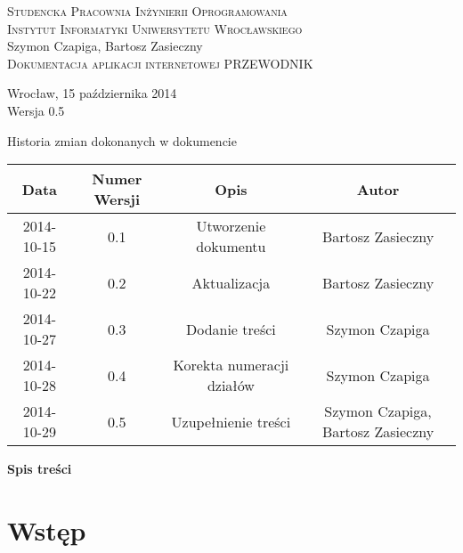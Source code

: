 \documentclass[12pt,a4paper]{report}
\makeatletter
\newcommand*{\toccontents}{\@starttoc{toc}}
\makeatother
\begin{document}
\newcommand{\itab}[1]{\hspace{4em}\rlap{#1}}
\newcommand{\tab}[1]{\hspace{.2\textwidth}\rlap{#1}}

\begin{titlepage}
\begin{center}
\textsc{Studencka Pracownia Inżynierii Oprogramowania}\\[0.5cm]
\textsc{Instytut Informatyki Uniwersytetu Wrocławskiego}\\[7.3cm]

Szymon Czapiga, Bartosz Zasieczny\\[1.0cm]

\LARGE{\textsc{Dokumentacja aplikacji internetowej PRZEWODNIK}}\\[8.0cm]

\begin{normalsize}

Wrocław, 15 października 2014\\[0.5cm]
Wersja 0.5
\end{normalsize}
\end{center}
\end{titlepage}

\begin{table}[h1]
 \itab \textit{Tabela 0.} Historia zmian dokonanych w dokumencie
  \begin{center}
    \begin{tabular}{| c | c | c | c |}
    \hline
    Data & Numer Wersji & Opis & Autor \\
    \hline \hline
    2014-10-15 & 0.1 & Utworzenie dokumentu & Bartosz Zasieczny \\
    \hline
    2014-10-22 & 0.2 & Aktualizacja & Bartosz Zasieczny \\
    \hline
    2014-10-27 & 0.3 & Dodanie treści  & Szymon Czapiga \\
    \hline
    2014-10-28 & 0.4 & Korekta numeracji działów & Szymon Czapiga \\
    \hline
    2014-10-29 & 0.5 & Uzupełnienie treści & Szymon Czapiga, Bartosz Zasieczny \\
    \hline
    \end{tabular}
  \end{center}
\end{table}
\textbf{\large{Spis treści}}\\[0.3cm]
\toccontents
\newpage
\section{Wstęp}
\end{document}
